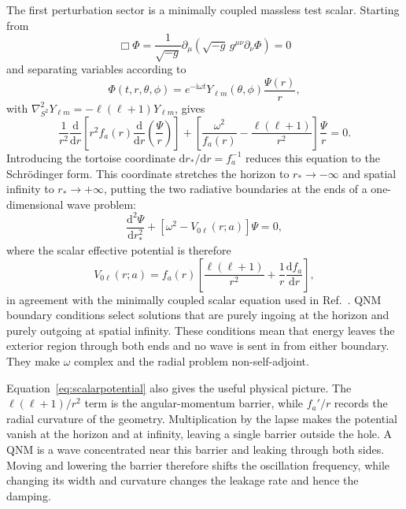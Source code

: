 \documentclass[12pt,a4paper]{article}
\newcommand{\dd}{\mathrm{d}}
\newcommand{\ii}{\mathrm{i}}
\begin{document}
\color{blue}
The first perturbation sector is a minimally coupled massless test scalar.
Starting from
\begin{equation}
\Box\Phi=\frac{1}{\sqrt{-g}}\partial_\mu
\left(\sqrt{-g}\,g^{\mu\nu}\partial_\nu\Phi\right)=0
\label{eq:kleingordon}
\end{equation}
and separating variables according to
\begin{equation}
\Phi(t,r,\theta,\phi)=e^{-\ii\omega t}Y_{\ell m}(\theta,\phi)
\frac{\Psi(r)}{r},
\label{eq:scalarseparation}
\end{equation}
with \(\nabla^2_{S^2}Y_{\ell m}=-\ell(\ell+1)Y_{\ell m}\), gives
\begin{equation}
\frac{1}{r^2}\frac{\dd}{\dd r}
\left[r^2 f_a(r)\frac{\dd}{\dd r}\left(\frac{\Psi}{r}\right)\right]
+\left[\frac{\omega^2}{f_a(r)}-\frac{\ell(\ell+1)}{r^2}\right]
\frac{\Psi}{r}=0.
\label{eq:scalarintermediate}
\end{equation}
Introducing the tortoise coordinate \(\dd r_*/\dd r=f_a^{-1}\) reduces this
equation to the Schr\"odinger form.  This coordinate stretches the horizon to
\(r_*\to-\infty\) and spatial infinity to \(r_*\to+\infty\), putting the two
radiative boundaries at the ends of a one-dimensional wave problem:
\begin{equation}
\frac{\dd^2\Psi}{\dd r_*^2}+
\left[\omega^2 - V_{0\ell}(r;a)\right]\Psi=0,
\label{eq:qnmwave}
\end{equation}
where the scalar effective potential is therefore
\color{black}
\begin{equation}
V_{0\ell}(r;a)=f_a(r)\left[\frac{\ell(\ell+1)}{r^2}+\frac{1}{r}\frac{\dd f_a}{\dd r}\right],
\label{eq:scalarpotential}
\end{equation}
\color{blue}
in agreement with the minimally coupled scalar equation used in
Ref.~\cite{Konoplya2020}.  QNM boundary conditions select solutions that are
purely ingoing at the horizon and purely outgoing at spatial infinity.  These
conditions mean that energy leaves the exterior region through both ends and
no wave is sent in from either boundary.  They make \(\omega\) complex and the
radial problem non-self-adjoint.

Equation~\eqref{eq:scalarpotential} also gives the useful physical picture.
The \(\ell(\ell+1)/r^2\) term is the angular-momentum barrier, while
\(f_a'/r\) records the radial curvature of the geometry.  Multiplication by
the lapse makes the potential vanish at the horizon and at infinity, leaving a
single barrier outside the hole.  A QNM is a wave concentrated near this
barrier and leaking through both sides.  Moving and lowering the barrier
therefore shifts the oscillation frequency, while changing its width and
curvature changes the leakage rate and hence the damping.
\end{document}
